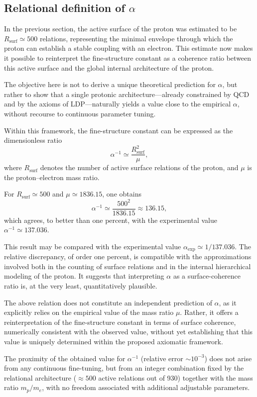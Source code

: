 \documentclass[11pt,a4paper]{article}
\begin{document}
\subsection{Relational definition of \(\alpha\)}

In the previous section, the active surface of the proton was estimated to be \(R_{\mathrm{surf}} \simeq 500\) relations, representing the minimal envelope through which the proton can establish a stable coupling with an electron. This estimate now makes it possible to reinterpret the fine-structure constant as a coherence ratio between this active surface and the global internal architecture of the proton.

The objective here is not to derive a unique theoretical prediction for \(\alpha\), but rather to show that a single protonic architecture—already constrained by QCD and by the axioms of LDP—naturally yields a value close to the empirical \(\alpha\), without recourse to continuous parameter tuning.

Within this framework, the fine-structure constant can be expressed as the dimensionless ratio
\[
\alpha^{-1} \simeq \frac{R_{\mathrm{surf}}^{2}}{\mu},
\]
where \(R_{\mathrm{surf}}\) denotes the number of active surface relations of the proton, and \(\mu\) is the proton–electron mass ratio.

For \(R_{\mathrm{surf}} \simeq 500\) and \(\mu \simeq 1836.15\), one obtains
\[
\alpha^{-1}
\simeq \frac{500^{2}}{1836.15}
\approx 136.15,
\]
which agrees, to better than one percent, with the experimental value \(\alpha^{-1} \simeq 137.036\).

This result may be compared with the experimental value \(\alpha_{\mathrm{exp}} \simeq 1/137.036\). The relative discrepancy, of order one percent, is compatible with the approximations involved both in the counting of surface relations and in the internal hierarchical modeling of the proton. It suggests that interpreting \(\alpha\) as a surface-coherence ratio is, at the very least, quantitatively plausible.

The above relation does not constitute an independent prediction of \(\alpha\), as it explicitly relies on the empirical value of the mass ratio \(\mu\). Rather, it offers a reinterpretation of the fine-structure constant in terms of surface coherence, numerically consistent with the observed value, without yet establishing that this value is uniquely determined within the proposed axiomatic framework.

The proximity of the obtained value for \(\alpha^{-1}\) (relative error \(\sim 10^{-3}\)) does not arise from any continuous fine-tuning, but from an integer combination fixed by the relational architecture (\(\approx 500\) active relations out of 930) together with the mass ratio \(m_p/m_e\), with no freedom associated with additional adjustable parameters.
\end{document}
